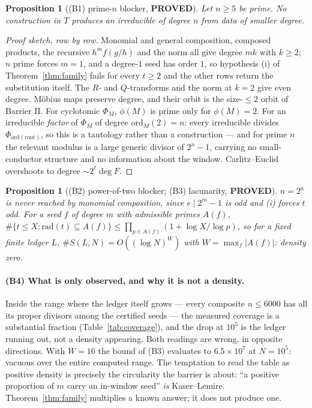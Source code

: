 \documentclass[10pt]{article}
\theoremstyle{plain}
\newtheorem{proposition}[theorem]{Proposition}
\theoremstyle{definition}
\newcommand{\proved}{\textcolor{proved}{\textsf{\textbf{\footnotesize PROVED}}}}
\begin{document}
\begin{proposition}[(B1) prime-$n$ blocker, \proved]\label{prop:primen}
Let $n\ge5$ be prime. No construction in $T$ produces an irreducible of degree
$n$ from data of smaller degree.
\end{proposition}

\begin{proof}[Proof sketch, row by row]
Monomial and general composition, composed products, the recursive $h^mf(g/h)$
and the norm all give degree $mk$ with $k\ge2$; $n$ prime forces $m=1$, and a
degree-$1$ seed has order $1$, so hypothesis (i) of Theorem~\ref{thm:family}
fails for every $t\ge2$ and the other rows return the substitution itself. The
$R$- and $Q$-transforms and the norm at $k=2$ give even degree. M\"obius maps
preserve degree, and their orbit is the size-$\le2$ orbit of Barrier II. For
cyclotomic $\Phi_M$, $\phi(M)$ is prime only for $\phi(M)=2$. For an
irreducible \emph{factor} of $\Phi_M$ of degree $\mathrm{ord}_M(2)=n$: every
irreducible divides $\Phi_{\mathrm{ord}(\text{root})}$, so this is a tautology
rather than a construction --- and for prime $n$ the relevant modulus is a large
generic divisor of $2^n-1$, carrying no small-conductor structure and no
information about the window. Carlitz--Euclid overshoots to degree
$\sim2^{\ell}\deg F$.
\end{proof}

\begin{proposition}[(B2) power-of-two blocker; (B3) lacunarity, \proved]
$n=2^{a}$ is never reached by monomial composition, since $e\mid2^m-1$ is odd
and (i) forces $t$ odd. For a seed $f$ of degree $m$ with admissible primes
$A(f)$, $\#\{t\le X:\mathrm{rad}(t)\subseteq A(f)\}\le\prod_{p\in
A(f)}(1+\log X/\log p)$, so for a \emph{fixed finite} ledger $L$,
$\#S(L,N)=O((\log N)^{W})$ with $W=\max_f|A(f)|$: density zero.
\end{proposition}

\paragraph{(B4) What is only observed, and why it is not a density.} Inside the
range where the ledger itself grows --- every composite $n\le6000$ has all its
proper divisors among the certified seeds --- the measured coverage is a
substantial fraction (Table~\ref{tab:coverage}), and the drop at $10^5$ is the
ledger running out, not a density appearing. Both readings are wrong, in
opposite directions. With $W=16$ the bound of (B3) evaluates to $6.5\times10^7$
at $N=10^5$: vacuous over the entire computed range. The temptation to read the
table as positive density is precisely the circularity the barrier is about:
``a positive proportion of $m$ carry an in-window seed'' \emph{is}
Kaser--Lemire. Theorem~\ref{thm:family} multiplies a known answer; it does not
produce one.
\end{document}
